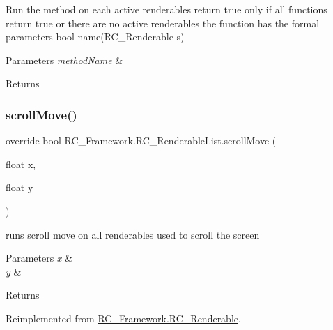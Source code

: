 Run the method on each active renderables return true only if all functions return true or there are no active renderables the function has the formal parameters bool name(\+R\+C\+\_\+\+Renderable s) 


\begin{DoxyParams}{Parameters}
{\em method\+Name} & \\
\hline
\end{DoxyParams}
\begin{DoxyReturn}{Returns}

\end{DoxyReturn}
\mbox{\label{class_r_c___framework_1_1_r_c___renderable_list_ad7238f93a7ad63020771702a2db0ccfe}} 
\subsubsection{\texorpdfstring{scroll\+Move()}{scrollMove()}}
{\footnotesize\ttfamily override bool R\+C\+\_\+\+Framework.\+R\+C\+\_\+\+Renderable\+List.\+scroll\+Move (\begin{DoxyParamCaption}\item[{float}]{x,  }\item[{float}]{y }\end{DoxyParamCaption})\hspace{0.3cm}{\ttfamily [virtual]}}



runs scroll move on all renderables used to scroll the screen 


\begin{DoxyParams}{Parameters}
{\em x} & \\
\hline
{\em y} & \\
\hline
\end{DoxyParams}
\begin{DoxyReturn}{Returns}

\end{DoxyReturn}


Reimplemented from \mbox{\hyperlink{class_r_c___framework_1_1_r_c___renderable_a21e5b1a68c7382443c82e7296fd2209a}{R\+C\+\_\+\+Framework.\+R\+C\+\_\+\+Renderable}}.

